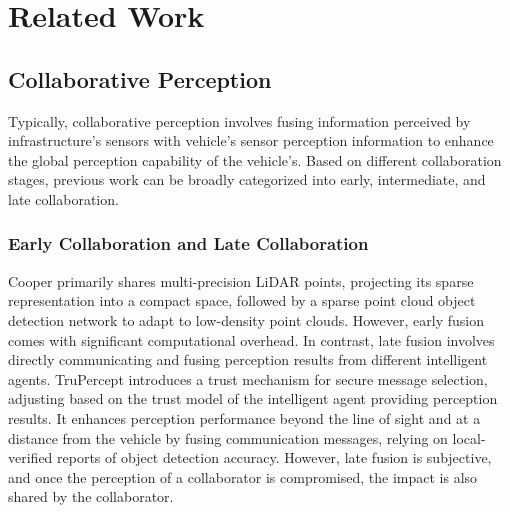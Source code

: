 \section{Related Work}
\subsection{Collaborative Perception}
 Typically, collaborative perception involves fusing information perceived by infrastructure's sensors with vehicle's sensor perception information to enhance the global perception capability of the vehicle's. Based on different collaboration stages, previous work can be broadly categorized into early, intermediate, and late collaboration.
\subsubsection{Early Collaboration and Late Collaboration}
Cooper \cite{8885377} primarily shares multi-precision LiDAR points, projecting its sparse representation into a compact space, followed by a sparse point cloud object detection network to adapt to low-density point clouds. However, early fusion comes with significant computational overhead. In contrast, late fusion involves directly communicating and fusing perception results from different intelligent agents. TruPercept \cite{9304695} introduces a trust mechanism for secure message selection, adjusting based on the trust model of the intelligent agent providing perception results. It enhances perception performance beyond the line of sight and at a distance from the vehicle by fusing communication messages, relying on local-verified reports of object detection accuracy. However, late fusion is subjective, and once the perception of a collaborator is compromised, the impact is also shared by the collaborator.

